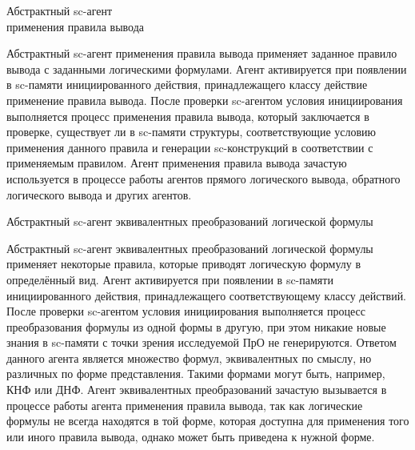 \begin{frame}{Абстрактный sc-агент\\ применения правила вывода}
\topline
\justifying
\vspace{10mm}

  Абстрактный sc-агент применения правила вывода применяет заданное правило вывода с заданными логическими формулами. Агент активируется при появлении в sc-памяти инициированного действия, принадлежащего классу действие применение правила вывода. После проверки sc-агентом условия инициирования выполняется процесс применения правила вывода, который заключается в проверке, существует ли в sc-памяти структуры, соответствующие условию применения данного правила и генерации sc-конструкций в соответствии с применяемым правилом. Агент применения правила вывода зачастую используется в процессе работы агентов прямого логического вывода, обратного логического вывода и других агентов.  
\end{frame}


\begin{frame}{\Large Абстрактный sc-агент эквивалентных преобразований логической формулы}
\topline
\justifying
\vspace{10mm}

  Абстрактный sc-агент эквивалентных преобразований логической формулы применяет некоторые правила, которые приводят логическую формулу в определённый вид. Агент активируется при появлении в sc-памяти инициированного действия, принадлежащего соответствующему классу действий. После проверки sc-агентом условия инициирования выполняется процесс преобразования формулы из одной формы в другую, при этом никакие новые знания в sc-памяти с точки зрения исследуемой ПрО не генерируются. Ответом данного агента является множество формул, эквивалентных по смыслу, но различных по форме представления. Такими формами могут быть, например, КНФ или ДНФ. Агент эквивалентных преобразований зачастую вызывается в процессе работы агента применения правила вывода, так как логические формулы не всегда находятся в той форме, которая доступна для применения того или иного правила вывода, однако может быть приведена к нужной форме.  
\end{frame}

